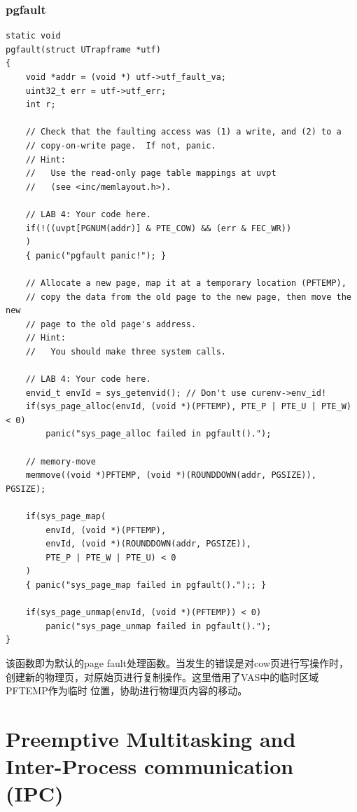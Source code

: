 \documentclass[12pt, letterpaper]{report}
\begin{document}
\newpage
\subsection{pgfault}

\lstset{style=CStyle}
\setmainfont{Consolas}
\begin{lstlisting}
static void
pgfault(struct UTrapframe *utf)
{
    void *addr = (void *) utf->utf_fault_va;
    uint32_t err = utf->utf_err;
    int r;

    // Check that the faulting access was (1) a write, and (2) to a
    // copy-on-write page.  If not, panic.
    // Hint:
    //   Use the read-only page table mappings at uvpt
    //   (see <inc/memlayout.h>).

    // LAB 4: Your code here.
    if(!((uvpt[PGNUM(addr)] & PTE_COW) && (err & FEC_WR))
    )
    { panic("pgfault panic!"); }

    // Allocate a new page, map it at a temporary location (PFTEMP),
    // copy the data from the old page to the new page, then move the new
    // page to the old page's address.
    // Hint:
    //   You should make three system calls.

    // LAB 4: Your code here.
    envid_t envId = sys_getenvid(); // Don't use curenv->env_id!
    if(sys_page_alloc(envId, (void *)(PFTEMP), PTE_P | PTE_U | PTE_W) < 0)
        panic("sys_page_alloc failed in pgfault().");

    // memory-move
    memmove((void *)PFTEMP, (void *)(ROUNDDOWN(addr, PGSIZE)), PGSIZE);

    if(sys_page_map(
        envId, (void *)(PFTEMP), 
        envId, (void *)(ROUNDDOWN(addr, PGSIZE)),
        PTE_P | PTE_W | PTE_U) < 0
    )
    { panic("sys_page_map failed in pgfault().");; }

    if(sys_page_unmap(envId, (void *)(PFTEMP)) < 0)
        panic("sys_page_unmap failed in pgfault().");
}
\end{lstlisting}
\setmainfont{Times New Roman}

\newpage
该函数即为默认的page fault处理函数。当发生的错误是对cow页进行写操作时，
创建新的物理页，对原始页进行复制操作。这里借用了VAS中的临时区域PFTEMP作为临时
位置，协助进行物理页内容的移动。

\chapter[\Large Preemptive Multitasking and Inter-Process communication (IPC)]{Preemptive Multitasking and Inter-Process communication (IPC)}
\end{document}

